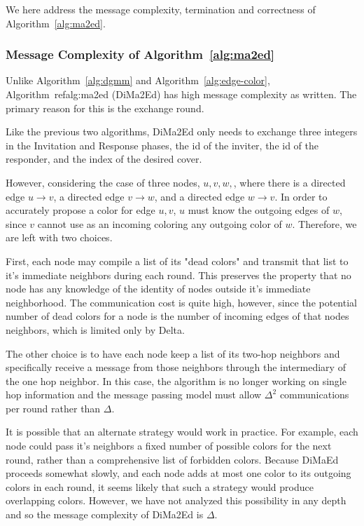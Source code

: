 \label{sec:dima2ed-correct}
We here address the message complexity, termination and correctness of Algorithm~\ref{alg:ma2ed}.

\subsubsection{Message Complexity of Algorithm~\ref{alg:ma2ed}}

Unlike Algorithm~\ref{alg:dgmm} and Algorithm~\ref{alg:edge-color}, Algorithm~ref{alg:ma2ed} (DiMa2Ed) has high message complexity as written. The primary reason for this is the exchange round.

Like the previous two algorithms, DiMa2Ed only needs to exchange three integers in the Invitation and Response phases, the id of the inviter, the id of the responder, and the index of the desired cover.

However, considering the case of three nodes, $u,v,w,$, where there is a directed edge $u \to v$, a directed edge $v \to w$, and a directed edge $w \to v$. In order to accurately propose a color for edge $u,v$, $u$ must know the outgoing edges of $w$, since $v$ cannot use as an incoming coloring any outgoing color of $w$. Therefore, we are left with two choices.

First, each node may compile a list of its "dead colors" and transmit that list to it's immediate neighbors during each round. This preserves the property that no node has any knowledge of the identity of nodes outside it's immediate neighborhood. The communication cost is quite high, however, since the potential number of dead colors for a node is the number of incoming edges of that nodes neighbors, which is limited only by Delta. 

The other choice is to have each node keep a list of its two-hop neighbors and specifically receive a message from those neighbors through the intermediary of the one hop neighbor. In this case, the algorithm is no longer working on single hop information and the message passing model must allow $\Delta^2$ communications per round rather than $\Delta$.

It is possible that an alternate strategy would work in practice. For example, each node could pass it's neighbors a fixed number of possible colors for the next round, rather than a comprehensive list of forbidden colors. Because DiMaEd proceeds somewhat slowly, and each node adds at most one color to its outgoing colors in each round, it seems likely that such a strategy would produce overlapping colors. However, we have not analyzed this possibility in any depth and so the message complexity of DiMa2Ed is $\Delta$.

